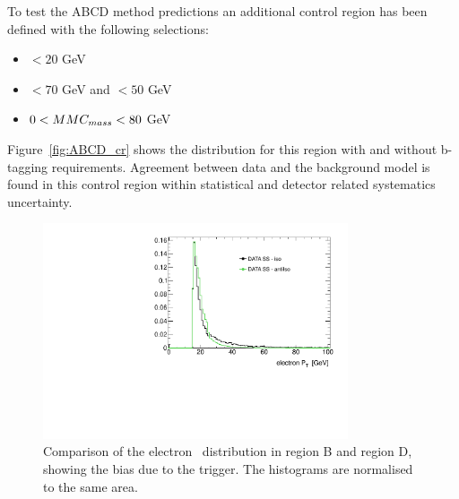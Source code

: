 To test the ABCD method predictions an additional control region has been defined with the following selections:
\begin{itemize}
\item \MET $< 20$ GeV
\item \Ht $< 70$ GeV and \SumLtMET$ < 50$ GeV
\item $0 < MMC_{mass} < 80$ GeV  	 
\end{itemize}
Figure~\ref{fig:ABCD_cr} shows the \mmc distribution for this region with and without b-tagging requirements. 
Agreement between data and the background model is found in this control region within statistical and 
detector related systematics uncertainty. 

\begin{figure}[tp]
	\begin{center}
	\includegraphics[width=9cm]{figure/ABCD_regionB_Vs_regionD}
	\end{center}
	\caption{Comparison of the electron \pt~distribution in region B and region D, showing the bias due to the trigger. 
	The histograms are normalised to the same area.}
	\label{fig:BvsD}
\end{figure}



